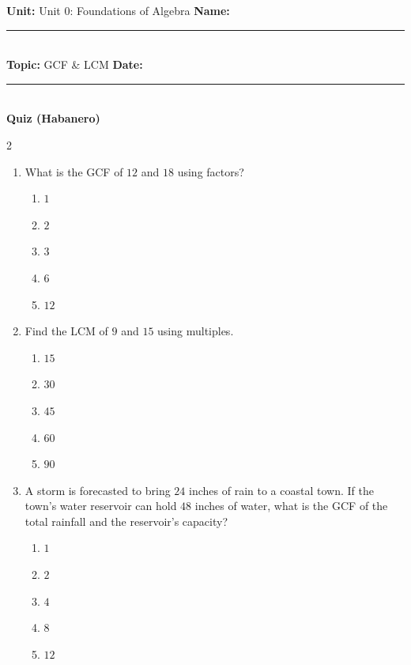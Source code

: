 \documentclass[10pt]{article}
\begin{document}
\enlargethispage{2.5cm}

\begin{tcolorbox}[colback=mainblue!5, colframe=mainblue, sharp corners, boxrule=0.5pt]
    \small \textbf{Unit:} Unit 0: Foundations of Algebra \hfill \textbf{Name:} \rule{3cm}{0.4pt} \\
    \small \textbf{Topic:} GCF & LCM \hfill \textbf{Date:} \rule{2cm}{0.4pt} \\
    \centering \textbf{\large Quiz (Habanero)}
\end{tcolorbox}

\vspace{0.2cm}

\begin{multicols}{2}
\begin{enumerate}[label=\textbf{Q\arabic*.}, leftmargin=*, itemsep=6pt, parsep=0pt]

  \item \small What is the GCF of $12$ and $18$ using factors?
  \begin{enumerate}[label=(\Alph*), leftmargin=0.6cm, nosep, itemsep=2pt]
    \item $1$
    \item $2$
    \item $3$
    \item $6$
    \item $12$
  \end{enumerate}

  \item \small Find the LCM of $9$ and $15$ using multiples.
  \begin{enumerate}[label=(\Alph*), leftmargin=0.6cm, nosep, itemsep=2pt]
    \item $15$
    \item $30$
    \item $45$
    \item $60$
    \item $90$
  \end{enumerate}

  \item \small A storm is forecasted to bring $24$ inches of rain to a coastal town. If the town's water reservoir can hold $48$ inches of water, what is the GCF of the total rainfall and the reservoir's capacity?
  \begin{enumerate}[label=(\Alph*), leftmargin=0.6cm, nosep, itemsep=2pt]
    \item $1$
    \item $2$
    \item $4$
    \item $8$
    \item $12$
  \end{enumerate}


\end{enumerate}
\end{multicols}
\end{document}
